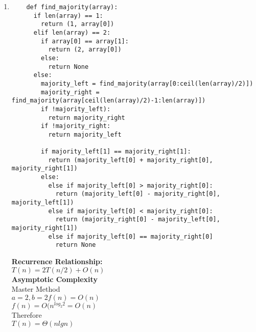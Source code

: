 \documentclass{article}
\begin{document}
\begin{enumerate}
    \item\begin{verbatim}
    def find_majority(array):
      if len(array) == 1:
        return (1, array[0])
      elif len(array) == 2:
        if array[0] == array[1]:
          return (2, array[0])
        else:
          return None
      else:
        majority_left = find_majority(array[0:ceil(len(array)/2)])
        majority_right = find_majority(array[ceil(len(array)/2)-1:len(array)])
        if !majority_left):
          return majority_right
        if !majority_right:
          return majority_left

        if majority_left[1] == majority_right[1]:
          return (majority_left[0] + majority_right[0], majority_right[1])
        else:
          else if majority_left[0] > majority_right[0]:
            return (majority_left[0] - majority_right[0], majority_left[1])
          else if majority_left[0] < majority_right[0]:
            return (majority_right[0] - majority_left[0], majority_right[1])
          else if majority_left[0] == majority_right[0]
            return None
    \end{verbatim}

    \textbf{Recurrence Relationship:}\\
    $T(n) = 2T(n/2) + O(n)$\\
    \textbf{Asymptotic Complexity}\\
    Master Method\\
    $a = 2, b=2 f(n)=O(n)$\\
    $f(n) = O(n^{log_2{2}} = O(n)$\\
    Therefore\\
    $T(n) = \Theta(nlgn)$

  \end{enumerate}
\end{document}
